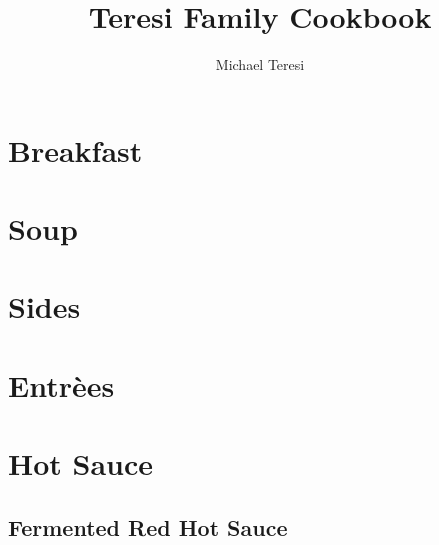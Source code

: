 \documentclass[]{article}
\begin{document}
\title{Teresi Family Cookbook}
\author{Michael Teresi}
\maketitle

\tableofcontents


\clearpage
\section{Breakfast}


\clearpage
\section{Soup}



\clearpage
\section{Sides}


\clearpage
\section{Entr\`{e}es}






\clearpage
\section{Hot Sauce}
{

	\let\section\subsection
	\let\subsection\subsubsection
	\section{Fermented Red Hot Sauce}
	
}
\end{document}
